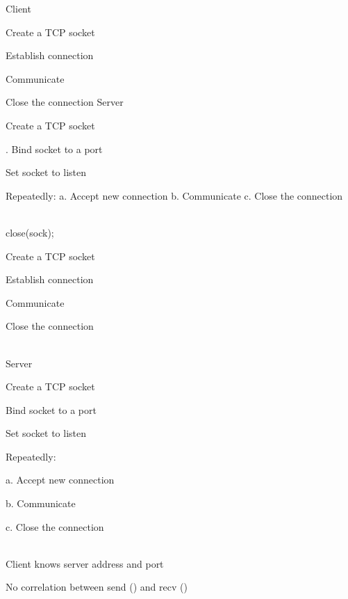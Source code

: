 \begin{description}
Client

\begin{enumerate}
  \ite Create a TCP socket

  \ite Establish connection

  \ite Communicate

  \ite Close the connection Server

  \ite Create a TCP socket

\end{enumerate}

. Bind socket to a port

\begin{enumerate}
  \setcounter{enumi}{2}
  \ite Set socket to listen

  \ite Repeatedly:
a. Accept new connection
b. Communicate
c. Close the connection

\end{enumerate}


\os{\newpage}\item[{\rot\bf  TCP Client/Server Interaction }]~\\[-3ex]

close(sock);



\begin{enumerate}
  \ite Create a TCP socket

  \ite Establish connection

  \ite Communicate

  \ite Close the connection

\end{enumerate}


\os{\newpage}\item[{\rot\bf  close(clntSocket) }]~\\[-3ex]

Server

Create a TCP socket

Bind socket to a port

Set socket to listen

Repeatedly:

a. Accept new connection

b. Communicate

c. Close the connection


\item[{\rot\bf  TCP Tidbits  }]~\\[-3ex]

\bi
  \ite Client knows server address and port

  \ite No correlation between send () and recv ()


\end{description}
